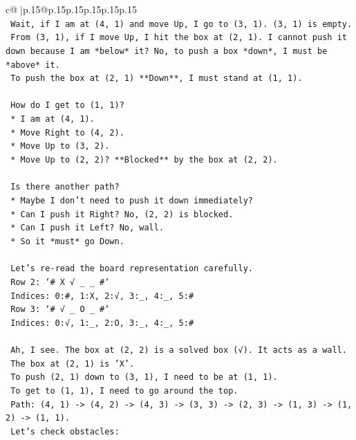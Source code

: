 \documentclass{article}
\begin{document}
{\begin{supertabular}{c@{$\;$}|p{.15\linewidth}@{}p{.15\linewidth}p{.15\linewidth}p{.15\linewidth}p{.15\linewidth}p{.15\linewidth}}
{{{\\ 
\texttt{    Wait, if I am at (4, 1) and move Up, I go to (3, 1). (3, 1) is empty.} \\
\texttt{    From (3, 1), if I move Up, I hit the box at (2, 1). I cannot push it down because I am *below* it? No, to push a box *down*, I must be *above* it.} \\
\texttt{    To push the box at (2, 1) **Down**, I must stand at (1, 1).} \\
\\ 
\texttt{    How do I get to (1, 1)?} \\
\texttt{    *   I am at (4, 1).} \\
\texttt{    *   Move Right to (4, 2).} \\
\texttt{    *   Move Up to (3, 2).} \\
\texttt{    *   Move Up to (2, 2)? **Blocked** by the box at (2, 2).} \\
\\ 
\texttt{    Is there another path?} \\
\texttt{    *   Maybe I don't need to push it down immediately?} \\
\texttt{    *   Can I push it Right? No, (2, 2) is blocked.} \\
\texttt{    *   Can I push it Left? No, wall.} \\
\texttt{    *   So it *must* go Down.} \\
\\ 
\texttt{    Let's re{-}read the board representation carefully.} \\
\texttt{    Row 2: `\# X √ \_ \_ \#`} \\
\texttt{    Indices: 0:\#, 1:X, 2:√, 3:\_, 4:\_, 5:\#} \\
\texttt{    Row 3: `\# √ \_ O \_ \#`} \\
\texttt{    Indices: 0:√, 1:\_, 2:O, 3:\_, 4:\_, 5:\#} \\
\\ 
\texttt{    Ah, I see. The box at (2, 2) is a solved box (√). It acts as a wall.} \\
\texttt{    The box at (2, 1) is 'X'.} \\
\texttt{    To push (2, 1) down to (3, 1), I need to be at (1, 1).} \\
\texttt{    To get to (1, 1), I need to go around the top.} \\
\texttt{    Path: (4, 1) {-}> (4, 2) {-}> (4, 3) {-}> (3, 3) {-}> (2, 3) {-}> (1, 3) {-}> (1, 2) {-}> (1, 1).} \\
\texttt{    Let's check obstacles:} \\
}}}
\end{supertabular}}
\end{document}
